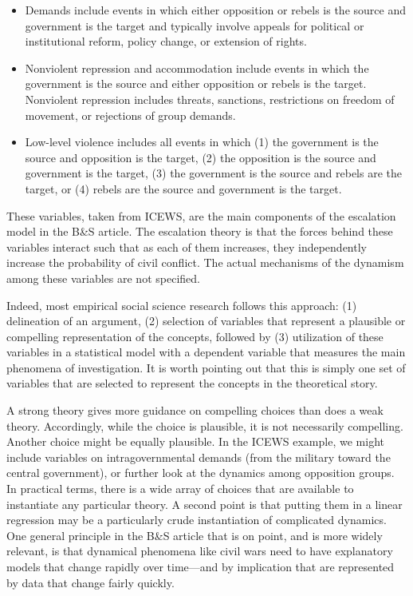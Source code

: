 \documentclass[
]{article}
\begin{document}
\begin{itemize}
\item Demands include events in which either opposition or rebels is the source and government is the target and typically involve appeals for political or institutional reform, policy change, or extension of rights.
\item Nonviolent repression and accommodation include events in which the government is the source and either opposition or rebels is the target. Nonviolent repression includes threats, sanctions, restrictions on freedom of movement, or rejections of group demands.
\item Low-level violence includes all events in which (1) the government is the source and opposition is the target, (2) the opposition is the source and government is the target, (3) the government is the source and rebels are the target, or (4) rebels are the source and government is the target.
\end{itemize}

These variables, taken from ICEWS, are the main components of the escalation model in the B\&S article. The escalation theory is that the forces behind these variables interact such that as each of them increases, they independently increase the probability of civil conflict. The actual mechanisms of the dynamism among these variables are not specified.

Indeed, most empirical social science research follows this approach: (1) delineation of an argument, (2) selection of variables that represent a plausible or compelling representation of the concepts, followed by (3) utilization of these variables in a statistical model with a dependent variable that measures the main phenomena of investigation. It is worth pointing out that this is simply one set of variables that are selected to represent the concepts in the theoretical story.

A strong theory gives more guidance on compelling choices than does a weak theory. Accordingly, while the choice is plausible, it is not necessarily compelling. Another choice might be equally plausible. In the ICEWS example, we might include variables on intragovernmental demands (from the military toward the central government), or further look at the dynamics among opposition groups. In practical terms, there is a wide array of choices that are available to instantiate any particular theory. A second point is that putting them in a linear regression may be a particularly crude instantiation of complicated dynamics. One general principle in the B\&S article that is on point, and is more widely relevant, is that dynamical phenomena like civil wars need to have explanatory models that change rapidly over time---and by implication that are represented by data that change fairly quickly.
\end{document}
